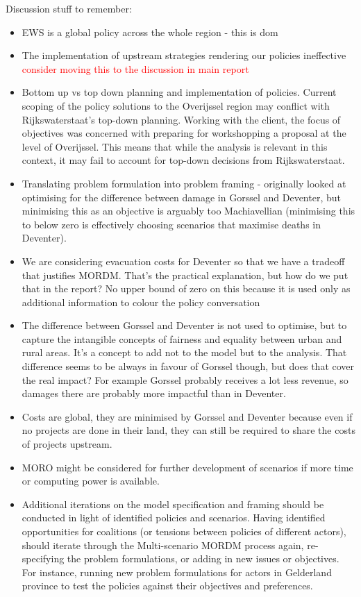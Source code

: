 Discussion stuff to remember:
\begin{itemize}
    \item EWS is a global policy across the whole region - this is dom
    \item The implementation of upstream strategies rendering our policies ineffective \textcolor{red}{consider moving this to the discussion in main report}
    \item Bottom up vs top down planning and implementation of policies. Current scoping of the policy solutions to the Overijssel region may conflict with Rijkswaterstaat's top-down planning. Working with the client, the focus of objectives was concerned with preparing for workshopping a proposal at the level of Overijssel. This means that while the analysis is relevant in this context, it may fail to account for top-down decisions from Rijkswaterstaat.
    \item Translating problem formulation into problem framing - originally looked at optimising for the difference between damage in Gorssel and Deventer, but minimising this as an objective is arguably too Machiavellian (minimising this to below zero is effectively choosing scenarios that maximise deaths in Deventer).
    \item We are considering evacuation costs for Deventer so that we have a tradeoff that justifies MORDM. That's the practical explanation, but how do we put that in the report? No upper bound of zero on this because it is used only as additional information to colour the policy conversation
    \item The difference between Gorssel and Deventer is not used to optimise, but to capture the intangible concepts of fairness and equality between urban and rural areas. It's a concept to add not to the model but to the analysis. That difference seems to be always in favour of Gorssel though, but does that cover the real impact? For example Gorssel probably receives a lot less revenue, so damages there are probably more impactful than in Deventer.
    \item Costs are global, they are minimised by Gorssel and Deventer because even if no projects are done in their land, they can still be required to share the costs of projects upstream.
    \item MORO might be considered for further development of scenarios if more time or computing power is available.
    \item Additional iterations on the model specification and framing should be conducted in light of identified policies and scenarios. Having identified opportunities for coalitions (or tensions between policies of different actors), should iterate through the Multi-scenario MORDM process again, re-specifying the problem formulations, or adding in new issues or objectives. For instance, running new problem formulations for actors in Gelderland province to test the policies against their objectives and preferences.

\end{itemize}
